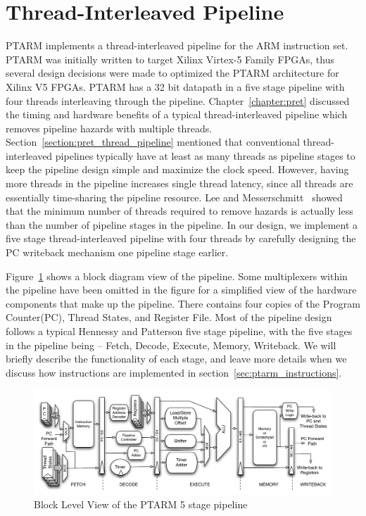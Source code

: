 \section{Thread-Interleaved Pipeline}
PTARM implements a thread-interleaved pipeline for the ARM instruction set.
PTARM was initially written to target Xilinx Virtex-5 Family FPGAs, thus several design decisions were made to optimized the PTARM architecture for Xilinx V5 FPGAs.
PTARM has a 32 bit datapath in a five stage pipeline with four threads interleaving through the pipeline. 
Chapter~\ref{chapter:pret} discussed the timing and hardware benefits of a typical thread-interleaved pipeline which removes pipeline hazards with multiple threads.
Section~\ref{section:pret_thread_pipeline} mentioned that conventional thread-interleaved pipelines typically have at least as many threads as pipeline stages to keep the pipeline design simple and maximize the clock speed.
However, having more threads in the pipeline increases single thread latency, since all threads are essentially time-sharing the pipeline resource. 
Lee and Messerschmitt~\cite{lee1987pip} showed that the minimum number of threads required to remove hazards is actually less than the number of pipeline stages in the pipeline. 
In our design, we implement a five stage thread-interleaved pipeline with four threads by carefully designing the PC writeback mechanism one pipeline stage earlier.

Figure~\ref{fig:ptarm_pipeline_five_stage} shows a block diagram view of the pipeline. 
Some multiplexers within the pipeline have been omitted in the figure for a simplified view of the hardware components that make up the pipeline.
There contains four copies of the Program Counter(PC), Thread States, and Register File.
Most of the pipeline design follows a typical Hennessy and Patterson five stage pipeline, with the five stages in the pipeline being -- Fetch, Decode, Execute, Memory, Writeback.
We will briefly describe the functionality of each stage, and leave more details when we discuss how instructions are implemented in section~\ref{sec:ptarm_instructions}.

\begin{figure}[b]
  \vspace{-20pt}
  \begin{center}
    \includegraphics[scale=.54]{figs/ptarm_pipeline_five_stage}
  \end{center}
  \vspace{-20pt}
  \caption{Block Level View of the PTARM 5 stage pipeline}
  \label{fig:ptarm_pipeline_five_stage}
\end{figure}

